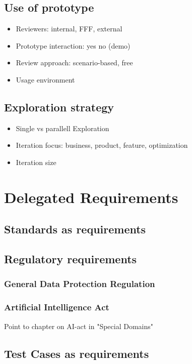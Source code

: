 \documentclass{reqengbook}
\begin{document}
\section{Use of prototype}
\begin{itemize}
  \item Reviewers: internal, FFF, external
  \item Prototype interaction: yes no (demo)
  \item Review approach: scenario-based, free
  \item Usage environment
\end{itemize}

\section{Exploration strategy}
\begin{itemize}
  \item Single vs parallell Exploration
  \item Iteration focus: business, product, feature, optimization
  \item Iteration size
\end{itemize}


\chapter{Delegated Requirements}

\section{Standards as requirements}

\section{Regulatory requirements}

\subsection{General Data Protection Regulation} 

\subsection{Artificial Intelligence Act}
Point to chapter on AI-act in "Special Domains"

\section{Test Cases as requirements}
\end{document}
